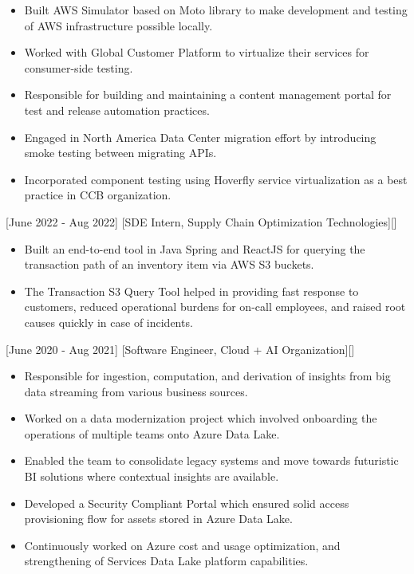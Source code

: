 \documentclass{article}
\begin{document}
\begin{itemize}
\item Built AWS Simulator based on Moto library to make development and testing of AWS infrastructure possible locally.
\item Worked with Global Customer Platform to virtualize their services for consumer-side testing.
\item Responsible for building and maintaining a content management portal for test and release automation practices.
\item Engaged in North America Data Center migration effort by introducing smoke testing between migrating APIs.
\item Incorporated component testing using Hoverfly service virtualization as a best practice in CCB organization.
\end{itemize}

[June 2022 - Aug 2022]
[SDE Intern, Supply Chain Optimization Technologies][]

\begin{itemize}
\item Built an end-to-end tool in Java Spring and ReactJS for querying the transaction path of an inventory item via AWS S3 buckets.
\item The Transaction S3 Query Tool helped in providing fast response to customers, reduced operational burdens for on-call employees, and raised root causes quickly in case of incidents.

\end{itemize}

[June 2020 - Aug 2021]
[Software Engineer, Cloud + AI Organization][]

\begin{itemize}
\item Responsible for ingestion, computation, and derivation of insights from big data streaming from various business sources.
\item Worked on a data modernization project which involved onboarding the operations of multiple teams onto Azure Data Lake.
\item Enabled the team to consolidate legacy systems and move towards futuristic BI solutions where contextual insights are available. 
\item Developed a Security Compliant Portal which ensured solid access provisioning flow for assets stored in Azure Data Lake.
\item Continuously worked on Azure cost and usage optimization, and strengthening of Services Data Lake platform capabilities.
\end{itemize}
\end{document}
